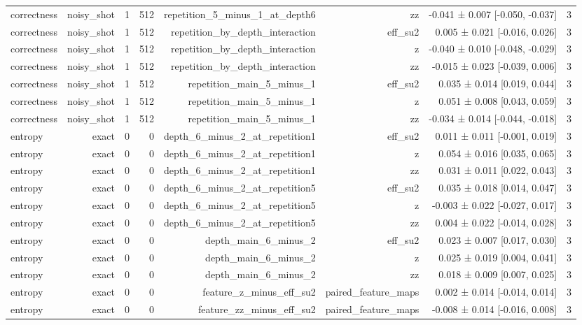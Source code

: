 \begin{table}
\begin{tabular}{lrrrrrrr}
correctness & noisy\_shot & 1 & 512 & repetition\_5\_minus\_1\_at\_depth6 & zz & -0.041 ± 0.007 [-0.050, -0.037] & 3 \\
correctness & noisy\_shot & 1 & 512 & repetition\_by\_depth\_interaction & eff\_su2 & 0.005 ± 0.021 [-0.016, 0.026] & 3 \\
correctness & noisy\_shot & 1 & 512 & repetition\_by\_depth\_interaction & z & -0.040 ± 0.010 [-0.048, -0.029] & 3 \\
correctness & noisy\_shot & 1 & 512 & repetition\_by\_depth\_interaction & zz & -0.015 ± 0.023 [-0.039, 0.006] & 3 \\
correctness & noisy\_shot & 1 & 512 & repetition\_main\_5\_minus\_1 & eff\_su2 & 0.035 ± 0.014 [0.019, 0.044] & 3 \\
correctness & noisy\_shot & 1 & 512 & repetition\_main\_5\_minus\_1 & z & 0.051 ± 0.008 [0.043, 0.059] & 3 \\
correctness & noisy\_shot & 1 & 512 & repetition\_main\_5\_minus\_1 & zz & -0.034 ± 0.014 [-0.044, -0.018] & 3 \\
entropy & exact & 0 & 0 & depth\_6\_minus\_2\_at\_repetition1 & eff\_su2 & 0.011 ± 0.011 [-0.001, 0.019] & 3 \\
entropy & exact & 0 & 0 & depth\_6\_minus\_2\_at\_repetition1 & z & 0.054 ± 0.016 [0.035, 0.065] & 3 \\
entropy & exact & 0 & 0 & depth\_6\_minus\_2\_at\_repetition1 & zz & 0.031 ± 0.011 [0.022, 0.043] & 3 \\
entropy & exact & 0 & 0 & depth\_6\_minus\_2\_at\_repetition5 & eff\_su2 & 0.035 ± 0.018 [0.014, 0.047] & 3 \\
entropy & exact & 0 & 0 & depth\_6\_minus\_2\_at\_repetition5 & z & -0.003 ± 0.022 [-0.027, 0.017] & 3 \\
entropy & exact & 0 & 0 & depth\_6\_minus\_2\_at\_repetition5 & zz & 0.004 ± 0.022 [-0.014, 0.028] & 3 \\
entropy & exact & 0 & 0 & depth\_main\_6\_minus\_2 & eff\_su2 & 0.023 ± 0.007 [0.017, 0.030] & 3 \\
entropy & exact & 0 & 0 & depth\_main\_6\_minus\_2 & z & 0.025 ± 0.019 [0.004, 0.041] & 3 \\
entropy & exact & 0 & 0 & depth\_main\_6\_minus\_2 & zz & 0.018 ± 0.009 [0.007, 0.025] & 3 \\
entropy & exact & 0 & 0 & feature\_z\_minus\_eff\_su2 & paired\_feature\_maps & 0.002 ± 0.014 [-0.014, 0.014] & 3 \\
entropy & exact & 0 & 0 & feature\_zz\_minus\_eff\_su2 & paired\_feature\_maps & -0.008 ± 0.014 [-0.016, 0.008] & 3 \\

\end{tabular}
\end{table}
